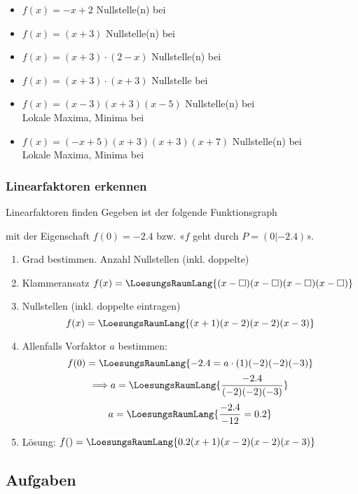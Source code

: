 \begin{itemize}
\item $f(x) = -x + 2 $ Nullstelle(n) bei  
\item $f(x) = (x+3)$ Nullstelle(n) bei 
\item $f(x) = (x+3)\cdot{}(2-x)$ Nullstelle(n) bei
\item $f(x) = (x+3)\cdot{}(x+3)$ 
  Nullstelle bei 
\item $f(x) = (x-3)(x+3)(x-5)$ Nullstelle(n) bei \\
  Lokale Maxima, Minima bei 
\item $f(x) = (-x+5)(x+3)(x+3)(x+7)$ Nullstelle(n) bei
  \\
  Lokale Maxima, Minima bei 
\end{itemize}
\newpage


\subsubsection{Linearfaktoren erkennen}

\begin{rezept}{Linearfaktoren finden}{}
Gegeben ist der folgende Funktionsgraph 

  mit der Eigenschaft $f(0) = -2.4$ bzw. «$f$ geht durch $P=(0|-2.4)$».
    
    \begin{enumerate}
  \item Grad bestimmen. Anzahl Nullstellen (inkl. doppelte) 
  \item Klammeransatz $f(x) =
    \LoesungsRaumLang{(x-\Box)(x-\Box)(x-\Box)(x-\Box)}$
  \item Nullstellen (inkl. doppelte eintragen)
    $$f(x) = \LoesungsRaumLang{(x+1)(x-2)(x-2)(x-3)}$$
  \item Allenfalls Vorfaktor $a$ bestimmen:
    $$f(0) = \LoesungsRaumLang{-2.4 = a \cdot{}(1)(-2)(-2)(-3)}$$
    $$\Longrightarrow a= \LoesungsRaumLang{\frac{-2.4}{(-2)(-2)(-3)}}$$
    $$a  = \LoesungsRaumLang{\frac{-2.4}{-12} = 0.2}$$

  \item Lösung: $f() = \LoesungsRaumLang{0.2 (x+1)(x-2)(x-2)(x-3)}$ 
    \end{enumerate}
  
  \end{rezept}
\newpage


\subsection*{Aufgaben}


\newpage

